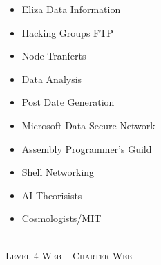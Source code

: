 \documentclass[11pt,twoside,a4paper]{book}
\begin{document}
\begin{minipage}[t]{0.45\linewidth}
	\begin{itemize}
		\setlength{\itemsep}{1pt}
		\setlength{\parskip}{0pt}
		\setlength{\parsep}{0pt}
		
		\item Eliza Data Information
		\item Hacking Groups FTP
		\item Node Tranferts
		\item Data Analysis
		\item Post Date Generation
	\end{itemize}
\end{minipage}
\hfill
\begin{minipage}[t]{0.45\linewidth}
	\begin{itemize}
		\setlength{\itemsep}{1pt}
		\setlength{\parskip}{0pt}
		\setlength{\parsep}{0pt}
		
		\item Microsoft Data Secure Network
		\item Assembly Programmer's Guild
		\item Shell Networking
		\item AI Theorisists
		\item Cosmologists/MIT
	\end{itemize}
\end{minipage}~\\

\noindent
\textsc{Level 4 Web -- Charter Web}
\end{document}
